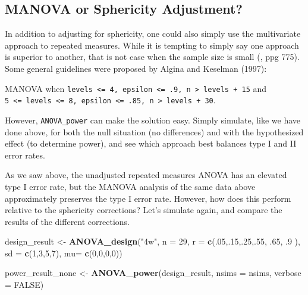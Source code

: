 \documentclass[]{book}
\newenvironment{Shaded}{\begin{snugshade}}{\end{snugshade}}
\newcommand{\DataTypeTok}[1]{\textcolor[rgb]{0.13,0.29,0.53}{#1}}
\newcommand{\DecValTok}[1]{\textcolor[rgb]{0.00,0.00,0.81}{#1}}
\newcommand{\FloatTok}[1]{\textcolor[rgb]{0.00,0.00,0.81}{#1}}
\newcommand{\KeywordTok}[1]{\textcolor[rgb]{0.13,0.29,0.53}{\textbf{#1}}}
\newcommand{\NormalTok}[1]{#1}
\newcommand{\OtherTok}[1]{\textcolor[rgb]{0.56,0.35,0.01}{#1}}
\newcommand{\StringTok}[1]{\textcolor[rgb]{0.31,0.60,0.02}{#1}}
\begin{document}
\hypertarget{manova-or-sphericity-adjustment}{%
\subsection{MANOVA or Sphericity Adjustment?}\label{manova-or-sphericity-adjustment}}

In addition to adjusting for sphericity, one could also simply use the multivariate approach to repeated measures.
While it is tempting to simply say one approach is superior to another, that is not case when the sample size is small (\citet{maxwell_designing_2004}, ppg 775). Some general guidelines were proposed by Algina and Keselman (1997):

MANOVA when \texttt{levels\ \textless{}=\ 4,\ epsilon\ \textless{}=\ .9,\ n\ \textgreater{}\ levels\ +\ 15} and \texttt{5\ \textless{}=\ levels\ \textless{}=\ 8,\ epsilon\ \textless{}=\ .85,\ n\ \textgreater{}\ levels\ +\ 30}.

However, \texttt{ANOVA\_power} can make the solution easy. Simply simulate, like we have done above, for both the null situation (no differences) and with the hypothesized effect (to determine power), and see which approach best balances type I and II error rates.

As we saw above, the unadjusted repeated measures ANOVA has an elevated type I error rate, but the MANOVA analysis of the same data above approximately preserves the type I error rate. However, how does this perform relative to the sphericity corrections? Let's simulate again, and compare the results of the different corrections.

\begin{Shaded}
\begin{Highlighting}[]
\NormalTok{design_result <-}\StringTok{ }\KeywordTok{ANOVA_design}\NormalTok{(}\StringTok{"4w"}\NormalTok{,}
                              \DataTypeTok{n =} \DecValTok{29}\NormalTok{,}
                              \DataTypeTok{r =} \KeywordTok{c}\NormalTok{(.}\DecValTok{05}\NormalTok{,.}\DecValTok{15}\NormalTok{,.}\DecValTok{25}\NormalTok{,.}\DecValTok{55}\NormalTok{, }\FloatTok{.65}\NormalTok{, }\FloatTok{.9}
\NormalTok{                              ),}
                              \DataTypeTok{sd =} \KeywordTok{c}\NormalTok{(}\DecValTok{1}\NormalTok{,}\DecValTok{3}\NormalTok{,}\DecValTok{5}\NormalTok{,}\DecValTok{7}\NormalTok{),}
                              \DataTypeTok{mu=} \KeywordTok{c}\NormalTok{(}\DecValTok{0}\NormalTok{,}\DecValTok{0}\NormalTok{,}\DecValTok{0}\NormalTok{,}\DecValTok{0}\NormalTok{))}

\NormalTok{power_result_none <-}\StringTok{ }\KeywordTok{ANOVA_power}\NormalTok{(design_result, }\DataTypeTok{nsims =}\NormalTok{ nsims, }\DataTypeTok{verbose =} \OtherTok{FALSE}\NormalTok{)}
\end{Highlighting}
\end{Shaded}
\end{document}
